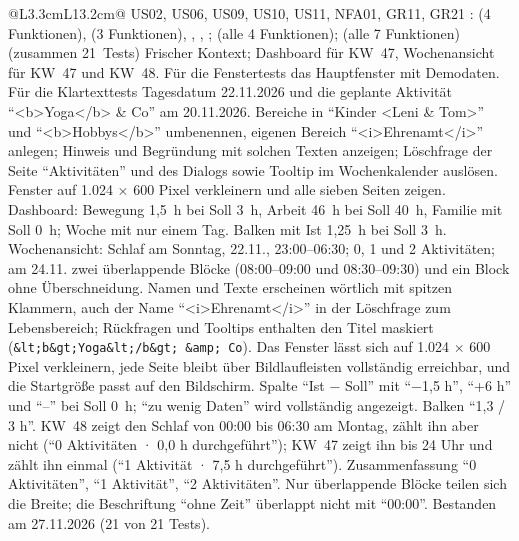 \begin{longtable}{@{}L{3.3cm}L{13.2cm}@{}}
    {US02, US06, US09, US10, US11, NFA01, GR11, GR21}
    {:  (4 Funktionen),  (3 Funktionen), , , ;  (alle 4 Funktionen);  (alle 7 Funktionen) (zusammen 21~Tests)}
    {Frischer Kontext; Dashboard für KW~47, Wochenansicht für KW~47 und KW~48. Für die Fenstertests das Hauptfenster mit Demodaten. Für die Klartexttests Tagesdatum 22.11.2026 und die geplante Aktivität \enquote{<b>Yoga</b> \& Co} am 20.11.2026.}
    {Bereiche in \enquote{Kinder <Leni \& Tom>} und \enquote{<b>Hobbys</b>} umbenennen, eigenen Bereich \enquote{<i>Ehrenamt</i>} anlegen; Hinweis und Begründung mit solchen Texten anzeigen; Löschfrage der Seite \enquote{Aktivitäten} und des Dialogs sowie Tooltip im Wochenkalender auslösen. Fenster auf 1.024 $\times$ 600 Pixel verkleinern und alle sieben Seiten zeigen. Dashboard: Bewegung 1,5~h bei Soll 3~h, Arbeit 46~h bei Soll 40~h, Familie mit Soll 0~h; Woche mit nur einem Tag. Balken mit Ist 1,25~h bei Soll 3~h. Wochenansicht: Schlaf am Sonntag, 22.11., 23:00--06:30; 0, 1 und 2 Aktivitäten; am 24.11. zwei überlappende Blöcke (08:00--09:00 und 08:30--09:30) und ein Block ohne Überschneidung.}
    {Namen und Texte erscheinen wörtlich mit spitzen Klammern, auch der Name \enquote{<i>Ehrenamt</i>} in der Löschfrage zum Lebensbereich; Rückfragen und Tooltips enthalten den Titel maskiert (\texttt{\&lt;b\&gt;Yoga\&lt;/b\&gt; \&amp; Co}). Das Fenster lässt sich auf 1.024 $\times$ 600 Pixel verkleinern, jede Seite bleibt über Bildlaufleisten vollständig erreichbar, und die Startgröße passt auf den Bildschirm. Spalte \enquote{Ist − Soll} mit \enquote{−1,5 h}, \enquote{+6 h} und \enquote{--} bei Soll 0~h; \enquote{zu wenig Daten} wird vollständig angezeigt. Balken \enquote{1,3 / 3 h}. KW~48 zeigt den Schlaf von 00:00 bis 06:30 am Montag, zählt ihn aber nicht (\enquote{0 Aktivitäten · 0,0 h durchgeführt}); KW~47 zeigt ihn bis 24 Uhr und zählt ihn einmal (\enquote{1 Aktivität · 7,5 h durchgeführt}). Zusammenfassung \enquote{0 Aktivitäten}, \enquote{1 Aktivität}, \enquote{2 Aktivitäten}. Nur überlappende Blöcke teilen sich die Breite; die Beschriftung \enquote{ohne Zeit} überlappt nicht mit \enquote{00:00}.}
    {Bestanden am 27.11.2026 (21 von 21 Tests).}
\end{longtable}
\endgroup
{}

